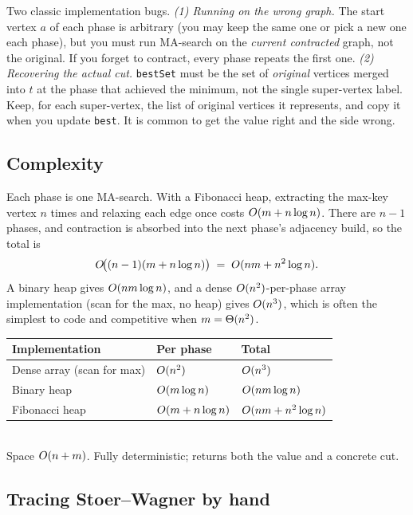 \begin{trapbox}
Two classic implementation bugs.
\emph{(1) Running on the wrong graph.} The start vertex $a$ of each phase is arbitrary (you may keep the same one or pick a new one each phase), but you must run MA-search on the \emph{current contracted} graph, not the original. If you forget to contract, every phase repeats the first one.
\emph{(2) Recovering the actual cut.} \texttt{bestSet} must be the set of \emph{original} vertices merged into $t$ at the phase that achieved the minimum, not the single super-vertex label. Keep, for each super-vertex, the list of original vertices it represents, and copy it when you update \texttt{best}. It is common to get the value right and the side wrong.
\end{trapbox}

\subsection{Complexity}

Each phase is one MA-search. With a Fibonacci heap, extracting the max-key vertex $n$ times and relaxing each edge once costs $O(m + n\log n)$. There are $n-1$ phases, and contraction is absorbed into the next phase's adjacency build, so the total is
\[
  O\!\big((n-1)(m + n\log n)\big) \;=\; O(nm + n^2\log n).
\]
A binary heap gives $O(nm\log n)$, and a dense $O(n^2)$-per-phase array implementation (scan for the max, no heap) gives $O(n^3)$, which is often the simplest to code and competitive when $m=\Theta(n^2)$.

\begin{complexitybox}
\begin{tabular}{lll}
\toprule
Implementation & Per phase & Total \\
\midrule
Dense array (scan for max) & $O(n^2)$ & $O(n^3)$ \\
Binary heap & $O(m\log n)$ & $O(nm\log n)$ \\
Fibonacci heap & $O(m+n\log n)$ & $O(nm+n^2\log n)$ \\
\bottomrule
\end{tabular}\\[0.4em]
Space $O(n+m)$. Fully deterministic; returns both the value and a concrete cut.
\end{complexitybox}

\subsection{Tracing Stoer--Wagner by hand}

